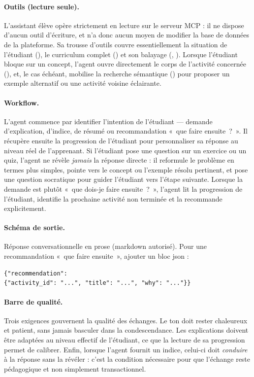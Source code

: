 \paragraph{Outils (lecture seule).} L'assistant élève opère
strictement en lecture sur le serveur MCP : il ne dispose d'aucun
outil d'écriture, et n'a donc aucun moyen de modifier la base de
données de la plateforme. Sa trousse d'outils couvre essentiellement
la situation de l'étudiant
(), le
curriculum complet () et son
balayage (,
). Lorsque l'étudiant
bloque sur un concept, l'agent ouvre directement le corps de
l'activité concernée (), et,
le cas échéant, mobilise la recherche sémantique
() pour
proposer un exemple alternatif ou une activité voisine éclairante.

\paragraph{Workflow.}
L'agent commence par identifier l'intention de l'étudiant — demande
d'explication, d'indice, de résumé ou recommandation «~que faire
ensuite~?~». Il récupère ensuite la progression de l'étudiant pour
personnaliser sa réponse au niveau réel de l'apprenant. Si
l'étudiant pose une question sur un exercice ou un quiz, l'agent
ne révèle \emph{jamais} la réponse directe : il reformule le
problème en termes plus simples, pointe vers le concept ou
l'exemple résolu pertinent, et pose une question socratique pour
guider l'étudiant vers l'étape suivante. Lorsque la demande est
plutôt «~que dois-je faire ensuite~?~», l'agent lit la progression
de l'étudiant, identifie la prochaine activité non terminée et la
recommande explicitement.

\paragraph{Schéma de sortie.} Réponse conversationnelle en prose (markdown
autorisé). Pour une recommandation «~que faire ensuite~», ajouter un bloc
\gls{json} :
\begin{center}
\texttt{\{"recommendation":\,\{"activity\_id":\,"...",\,"title":\,"...",\,"why":\,"..."\}\}}
\end{center}

\paragraph{Barre de qualité.} Trois exigences gouvernent la qualité
des échanges. Le ton doit rester chaleureux et patient, sans jamais
basculer dans la condescendance. Les explications doivent être
adaptées au niveau effectif de l'étudiant, ce que la lecture de sa
progression permet de calibrer. Enfin, lorsque l'agent fournit un
indice, celui-ci doit \emph{conduire} à la réponse sans la révéler :
c'est la condition nécessaire pour que l'échange reste pédagogique
et non simplement transactionnel.

